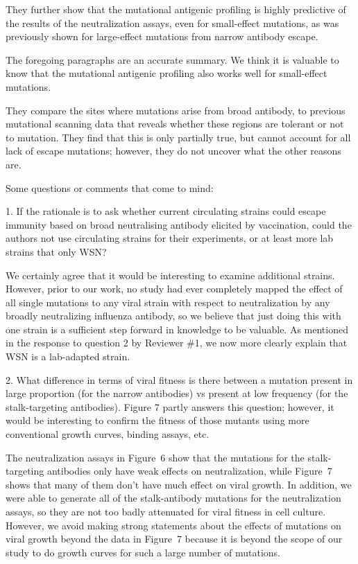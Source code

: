 \documentclass[11pt, oneside]{article}   	%
\begin{document}
They further show that the mutational antigenic profiling is highly predictive of the
results of the neutralization assays, even for small-effect mutations, as was previously shown for large-effect mutations from narrow antibody escape.

{\color{black}
The foregoing paragraphs are an accurate summary.
We think it is valuable to know that the mutational antigenic profiling also works well for small-effect mutations.
}

They compare the sites where mutations arise from broad antibody, to previous mutational scanning data that reveals whether these regions are tolerant or not to mutation. They find that this is only partially true, but cannot account for all lack of escape mutations; however, they do not uncover what the other reasons are.

Some questions or comments that come to mind:

1. If the rationale is to ask whether current circulating strains could escape immunity based on broad neutralising antibody elicited by vaccination, could the authors not use circulating strains for their experiments, or at least more lab strains that only WSN?

{\color{black}
We certainly agree that it would be interesting to examine additional strains.
However, prior to our work, no study had ever completely mapped the effect of all single mutations to any viral strain with respect to neutralization by any broadly neutralizing influenza antibody, so we believe that just doing this with one strain is a sufficient step forward in knowledge to be valuable.
As mentioned in the response to question 2 by Reviewer \#1, we now more clearly explain that WSN is a lab-adapted strain.
}

2. What difference in terms of viral fitness is there between a mutation present in large proportion (for the narrow antibodies) vs present at low frequency (for the stalk-targeting antibodies). Figure 7 partly answers this question; however, it would be interesting to confirm the fitness of those mutants using more conventional growth curves, binding assays, etc.

{\color{black}
The neutralization assays in Figure~6 show that the mutations for the stalk-targeting antibodies only have weak effects on neutralization, while Figure~7 shows that many of them don't have much effect on viral growth.
In addition, we were able to generate all of the stalk-antibody mutations for the neutralization assays, so they are not too badly attenuated for viral fitness in cell culture.
However, we avoid making strong statements about the effects of mutations on viral growth beyond the data in Figure~7 because it is beyond the scope of our study to do growth curves for such a large number of mutations.}
\end{document}
